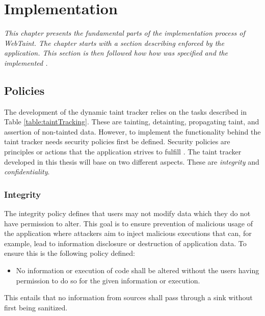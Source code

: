 \chapter{Implementation}
\label{Implementation}
\textit{This chapter presents the fundamental parts of the implementation process of WebTaint. The chapter starts with a section describing \textit{} enforced by the application. This section is then followed how how \textit{} was specified and the implemented \textit{}.}



\section{Policies}
\label{Policies}
The development of the dynamic taint tracker relies on the tasks described in Table \ref{table:taintTracking}. These are tainting, detainting, propagating taint, and assertion of non-tainted data. However, to implement the functionality behind the taint tracker needs security policies first be defined. Security policies are principles or actions that the application strives to fulfill \parencite{BayukJenniferL2012Cspg}. The taint tracker developed in this thesis will base on two different aspects. These are \textit{integrity} and \textit{confidentiality}.



\subsection{Integrity}
\label{Integrity}
The integrity policy defines that users may not modify data which they do not have permission to alter. This goal is to ensure prevention of malicious usage of the application where attackers aim to inject malicious executions that can, for example, lead to information disclosure or destruction of application data. To ensure this is the following policy defined:

\hfill
\begin{itemize}
    \item No information or execution of code shall be altered without the users having permission to do so for the given information or execution.
\end{itemize}
\hfill

This entails that no information from sources shall pass through a sink without first being sanitized.



